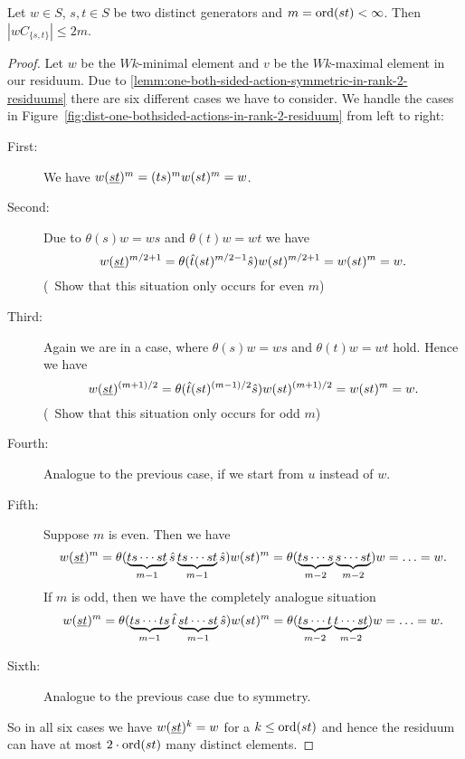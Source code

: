 \begin{lemm}
	Let $w \in S$, $s,t \in S$ be two distinct generators and $m = \operatorname{ord}(st) < \infty$. Then $|wC_{\{s,t\}}| \leq 2m$.

	\begin{proof}
		Let $w$ be the $Wk$-minimal element and $v$ be the $Wk$-maximal element in our residuum. Due to \ref{lemm:one-both-sided-action-symmetric-in-rank-2-residuums} there are six different cases we have to consider. We handle the cases in Figure~\ref{fig:dist-one-bothsided-actions-in-rank-2-residuum} from left to right:
		\begin{description}
			\item[First:] We have $w (\underline{s} \underline{t})^m = (ts)^m w (st)^m = w$.
			\item[Second:] Due to $\theta(s)w = ws$ and $\theta(t)w = wt$ we have
			$$ w (\underline{s} \underline{t})^{m/2+1} = \theta(\hat t (st)^{m/2-1} \hat s) w (st)^{m/2+1} = w(st)^m = w. $$
			(\todo \ Show that this situation only occurs for even $m$)
			\item[Third:] Again we are in a case, where $\theta(s)w = ws$ and $\theta(t)w = wt$ hold. Hence we have
			$$ w (\underline{s} \underline{t})^{(m+1)/2} = \theta(\hat t (st)^{(m-1)/2} \hat s) w (st)^{(m+1)/2} = w(st)^m = w. $$
			(\todo \ Show that this situation only occurs for odd $m$)
			\item[Fourth:] Analogue to the previous case, if we start from $u$ instead of $w$.
			\item[Fifth:] Suppose $m$ is even. Then we have
			$$ w (\underline{s} \underline{t})^m = \theta(\underbrace{ts \cdots st}_{m-1} \hat s \underbrace{ts \cdots st}_{m-1} \hat s) w (st)^m = \theta(\underbrace{ts \cdots s}_{m-2} \underbrace{s \cdots st}_{m-2}) w = \ldots = w. $$
			If $m$ is odd, then we have the completely analogue situation
			$$ w (\underline{s} \underline{t})^m = \theta(\underbrace{ts \cdots ts}_{m-1} \hat t \underbrace{st \cdots st}_{m-1} \hat s) w (st)^m = \theta(\underbrace{ts \cdots t}_{m-2} \underbrace{t \cdots st}_{m-2}) w = \ldots = w. $$
			\item[Sixth:] Analogue to the previous case due to symmetry.
		\end{description}
		So in all six cases we have $w (\underline{s} \underline{t})^k = w$ for a $k \leq \operatorname{ord}(st)$ and hence the residuum can have at most $2 \cdot \operatorname{ord}(st)$ many distinct elements.
	\end{proof}
\end{lemm}

